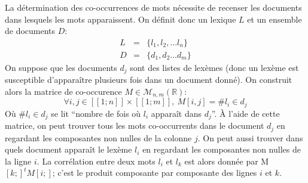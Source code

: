 \documentclass[french]{article}
\begin{document}
			La détermination des co-occurrences de mots nécessite de recenser les documents dans lesquels les mots apparaissent. On définit donc un lexique $L$ et un ensemble de documents $D$:
			\begin{eqnarray*}
				L &=& \lbrace l_1, l_2, \dots l_n \rbrace\\
				D &=& \lbrace d_1, d_2 \dots d_m \rbrace
			\end{eqnarray*}
			On suppose que les documents $d_j$ sont des listes de lexèmes (donc un lexème est susceptible d'apparaître plusieurs fois dans un document donné). On construit alors la matrice de co-occurence $M \in \mathcal{M}_{n, m}(\mathbb{R})$:
			\begin{equation*}
				\forall i, j \in [[1; n]] \times [[1; m]], \ M[i, j] = \# l_i \in d_j
			\end{equation*}
			Où $\# l_i \in d_j$ se lit ``nombre de fois où $l_i$ apparaît dans $d_j$''. À l'aide de cette matrice, on peut trouver tous les mots co-occurrents dans le document $d_j$ en regardant les composantes non nulles de la colonne $j$. On peut aussi trouver dans quels document apparaît le lexème $l_i$ en regardant les composantes non nulles de la ligne $i$. La corrélation entre deux mots $l_i$ et $l_k$ est alors donnée par M$[k;]^tM[i;]$; c'est le produit composante par composante des lignes $i$ et $k$.\\
			
\end{document}
